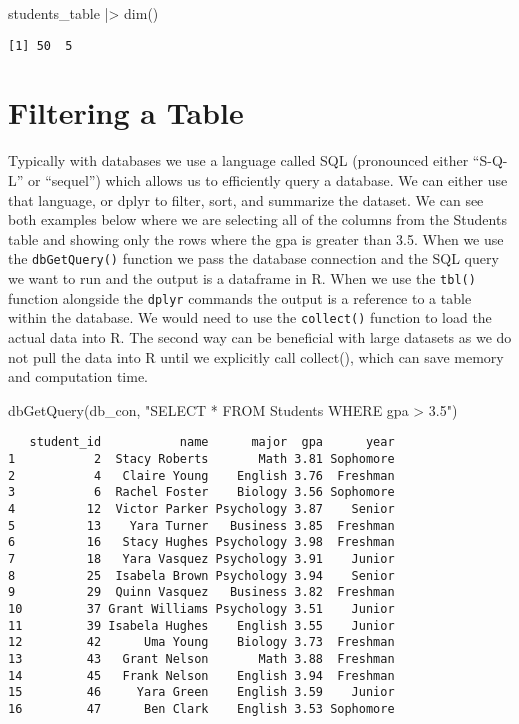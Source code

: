 \documentclass[
  letterpaper,
  DIV=11,
  numbers=noendperiod]{scrreprt}
\newenvironment{Shaded}{\begin{snugshade}}{\end{snugshade}}
\newcommand{\FunctionTok}[1]{\textcolor[rgb]{0.28,0.35,0.67}{#1}}
\newcommand{\NormalTok}[1]{\textcolor[rgb]{0.00,0.23,0.31}{#1}}
\newcommand{\SpecialCharTok}[1]{\textcolor[rgb]{0.37,0.37,0.37}{#1}}
\newcommand{\StringTok}[1]{\textcolor[rgb]{0.13,0.47,0.30}{#1}}
\begin{document}
\begin{Shaded}
\begin{Highlighting}[]
\NormalTok{students\_table }\SpecialCharTok{|\textgreater{}} \FunctionTok{dim}\NormalTok{()}
\end{Highlighting}
\end{Shaded}

\begin{verbatim}
[1] 50  5
\end{verbatim}

\section{Filtering a Table}\label{filtering-a-table}

Typically with databases we use a language called SQL (pronounced either
``S-Q-L'' or ``sequel'') which allows us to efficiently query a
database. We can either use that language, or dplyr to filter, sort, and
summarize the dataset. We can see both examples below where we are
selecting all of the columns from the Students table and showing only
the rows where the gpa is greater than 3.5. When we use the
\texttt{dbGetQuery()} function we pass the database connection and the
SQL query we want to run and the output is a dataframe in R. When we use
the \texttt{tbl()} function alongside the \texttt{dplyr} commands the
output is a reference to a table within the database. We would need to
use the \texttt{collect()} function to load the actual data into R. The
second way can be beneficial with large datasets as we do not pull the
data into R until we explicitly call collect(), which can save memory
and computation time.

\begin{Shaded}
\begin{Highlighting}[]
\FunctionTok{dbGetQuery}\NormalTok{(db\_con, }\StringTok{"SELECT * FROM Students WHERE gpa \textgreater{} 3.5"}\NormalTok{)}
\end{Highlighting}
\end{Shaded}

\begin{verbatim}
   student_id           name      major  gpa      year
1           2  Stacy Roberts       Math 3.81 Sophomore
2           4   Claire Young    English 3.76  Freshman
3           6  Rachel Foster    Biology 3.56 Sophomore
4          12  Victor Parker Psychology 3.87    Senior
5          13    Yara Turner   Business 3.85  Freshman
6          16   Stacy Hughes Psychology 3.98  Freshman
7          18   Yara Vasquez Psychology 3.91    Junior
8          25  Isabela Brown Psychology 3.94    Senior
9          29  Quinn Vasquez   Business 3.82  Freshman
10         37 Grant Williams Psychology 3.51    Junior
11         39 Isabela Hughes    English 3.55    Junior
12         42      Uma Young    Biology 3.73  Freshman
13         43   Grant Nelson       Math 3.88  Freshman
14         45   Frank Nelson    English 3.94  Freshman
15         46     Yara Green    English 3.59    Junior
16         47      Ben Clark    English 3.53 Sophomore
\end{verbatim}
\end{document}
